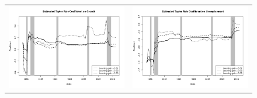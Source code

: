 \documentclass[12pt]{article}
\begin{document}
\begin{figure}
\begin{tabular}{cc}
\includegraphics[scale=0.4]{coef_growth_iv.png} & \includegraphics[scale=0.4]{coef_unemployment_iv.png} \\
\end{tabular}
\end{figure}
\end{document}
